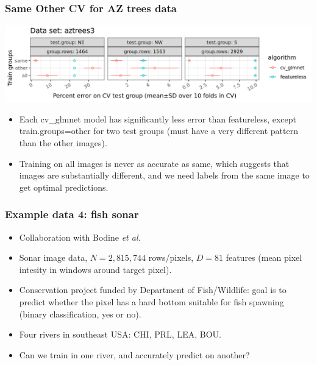 \documentclass{beamer}
\begin{document}
\begin{frame}
  \frametitle{Same Other CV for AZ trees data}
  \includegraphics[width=\textwidth]{aztrees3_error_glmnet_featureless_mean_SD.png}
  \begin{itemize}
  \item Each cv\_glmnet model has significantly less error than
    featureless, except train.groups=other for two test groups (must
    have a very different pattern than the other images).
  \item Training on all images is never as accurate as same, which
    suggests that images are substantially different, and we need
    labels from the same image to get optimal predictions.
  \end{itemize}
\end{frame}

\begin{frame}
  \frametitle{Example data 4: fish sonar}
  \begin{itemize}
  \item Collaboration with Bodine \emph{et al.}
  \item Sonar image data, $N=2,815,744$ rows/pixels, $D=81$
    features (mean pixel intesity in windows around target pixel).
  \item Conservation project funded by Department of Fish/Wildlife:
    goal is to predict whether the pixel has a hard bottom suitable
    for fish spawning (binary classification, yes or no).
  \item Four rivers in southeast USA: CHI, PRL, LEA, BOU.
  \item Can we train in one river, and accurately predict on another?
  \end{itemize}
\end{frame}
\end{document}

